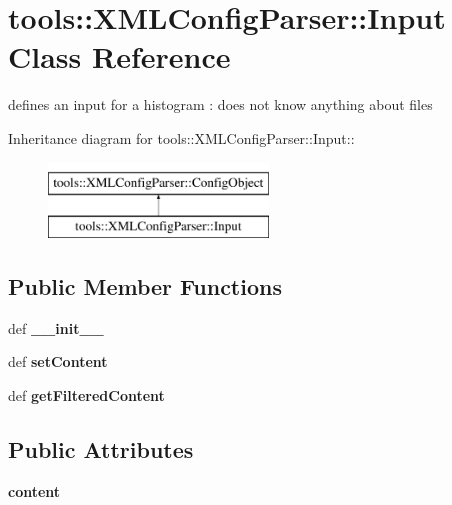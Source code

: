\hypertarget{classtools_1_1XMLConfigParser_1_1Input}{
\section{tools::XMLConfigParser::Input Class Reference}
\label{classtools_1_1XMLConfigParser_1_1Input}
}
defines an input for a histogram : does not know anything about files  


Inheritance diagram for tools::XMLConfigParser::Input::\begin{figure}[H]
\begin{center}
\leavevmode
\includegraphics[height=2cm]{classtools_1_1XMLConfigParser_1_1Input}
\end{center}
\end{figure}
\subsection*{Public Member Functions}
\begin{CompactItemize}
\item 
\hypertarget{classtools_1_1XMLConfigParser_1_1Input_65cca4bf221d237f5893e547adb1a3f4}{
def \textbf{\_\-\_\-init\_\-\_\-}}
\label{classtools_1_1XMLConfigParser_1_1Input_65cca4bf221d237f5893e547adb1a3f4}

\item 
\hypertarget{classtools_1_1XMLConfigParser_1_1Input_db1d4fac10a17fadc1e2392c4181c915}{
def \textbf{setContent}}
\label{classtools_1_1XMLConfigParser_1_1Input_db1d4fac10a17fadc1e2392c4181c915}

\item 
\hypertarget{classtools_1_1XMLConfigParser_1_1Input_0bf591eb6932a4550d6c2c4bc8432a81}{
def \textbf{getFilteredContent}}
\label{classtools_1_1XMLConfigParser_1_1Input_0bf591eb6932a4550d6c2c4bc8432a81}

\end{CompactItemize}
\subsection*{Public Attributes}
\begin{CompactItemize}
\item 
\hypertarget{classtools_1_1XMLConfigParser_1_1Input_74306ef1655f005fa860125d3e809583}{
\textbf{content}}
\label{classtools_1_1XMLConfigParser_1_1Input_74306ef1655f005fa860125d3e809583}

\end{CompactItemize}
